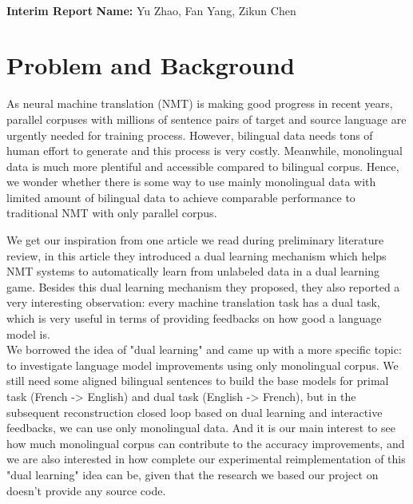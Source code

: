 \documentclass[11pt]{article}
\begin{document}
\\
{{\bf Interim Report} \hfill {{\bf Name:} Yu Zhao, Fan Yang, Zikun Chen} \\
\part{Problem and Background}
As neural machine translation (NMT) is making good progress in recent years, parallel corpuses with millions of sentence pairs of target and source language are urgently needed for training process. However, bilingual data needs tons of human effort to generate and this process is very costly. Meanwhile, monolingual data is much more plentiful and accessible compared to bilingual corpus. Hence, we wonder whether there is some way to use mainly monolingual data with limited amount of bilingual data to achieve comparable performance to traditional NMT with only parallel corpus.
\newline

We get our inspiration from one article\cite{he2016dual} we read during preliminary literature review, in this article they introduced a dual learning mechanism which helps NMT systems to automatically learn from unlabeled data in a dual learning game. Besides this dual learning mechanism they proposed, they also reported a very interesting observation: every machine translation task has a dual task, which is very useful in terms of providing feedbacks on how good a language model is.
\\
\newline
\indent We borrowed the idea of "dual learning" and came up with a more specific topic: to investigate language model improvements using only monolingual corpus. We still need some aligned bilingual sentences to build the base models for primal task (French -> English) and dual task (English -> French), but in the subsequent reconstruction closed loop based on dual learning and interactive feedbacks, we can use only monolingual data. And it is our main interest to see how much monolingual corpus can contribute to the accuracy improvements, and we are also interested in how complete our experimental reimplementation of this "dual learning" idea can be, given that the research we based our project on doesn't provide any source code.

}
\end{document}
